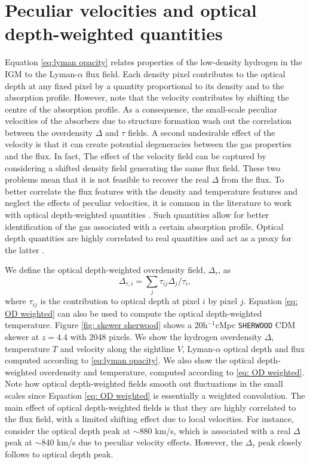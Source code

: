 \section{Peculiar velocities and optical depth-weighted quantities}\label{sec: optical depth weighted}
Equation \ref{eq:lyman opacity} relates properties of the low-density hydrogen in the IGM to the Lyman-$\alpha$ flux field. Each density pixel contributes to the optical depth at any fixed pixel by a quantity proportional to its density and to the absorption profile. However, note that the velocity contributes by shifting the centre of the absorption profile. As a consequence, the small-scale peculiar velocities of the absorbers due to structure formation wash out the correlation between the overdensity $\Delta$ and $\tau$ fields. A second undesirable effect of the velocity is that it can create potential degeneracies between the gas properties and the flux. In fact, The effect of the velocity field can be captured by considering a shifted density field generating the same flux field. These two problems mean that it is not feasible to recover the real $\Delta$ from the flux. To better correlate the flux features with the density and temperature features and neglect the effects of peculiar velocities, it is common in the literature to work with optical depth-weighted quantities \cite{_oltinsk__2021}. Such quantities allow for better identification of the gas associated with a certain absorption profile. Optical depth quantities are highly correlated to real quantities and act as a proxy for the latter \cite{Schaye1999}.

We define the optical depth-weighted overdensity field, $\Delta_\tau$, as
\begin{equation}\label{eq: OD weighted}
        \Delta_{\tau,i}=\sum_j \tau_{ij} \Delta_j /\tau_i,
\end{equation}
where $\tau_{ij}$ is the contribution to optical depth at pixel $i$ by pixel $j$. Equation \ref{eq: OD weighted} can also be used to compute the optical depth-weighted temperature. Figure \ref{fig: skewer sherwood} shows a 20h$^{-1}$cMpc \texttt{SHERWOOD} CDM skewer at $z=4.4$ with 2048 pixels. We show the hydrogen overdensity $\Delta$, temperature $T$ and velocity along the sightline $V$, Lyman-$\alpha$ optical depth and flux computed according to \ref{eq:lyman opacity}. We also show the optical depth-weighted overdensity and temperature, computed according to \ref{eq: OD weighted}. Note how optical depth-weighted fields smooth out fluctuations in the small scales since Equation \ref{eq: OD weighted} is essentially a weighted convolution. The main effect of optical depth-weighted fields is that they are highly correlated to the flux field, with a limited shifting effect due to local velocities. For instance, consider the optical depth peak at $\sim$880 km/s, which is associated with a real $\Delta$ peak at $\sim$840 km/s due to peculiar velocity effects. However, the $\Delta_\tau$ peak closely follows to optical depth peak.

